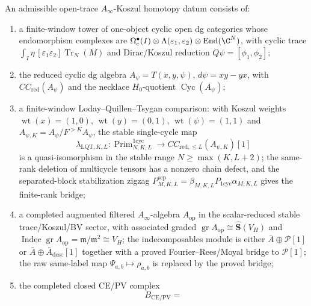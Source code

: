 \documentclass[11pt]{memoir}
\begin{document}
\begin{defn}\label{defn:stable-ainfty-koszul-homotopy-datum}
  An admissible open-trace \(A_\infty\)-Koszul homotopy datum
  consists of:
  \begin{enumerate}[label=(K\arabic*)]
    \item a finite-window tower of one-object cyclic open dg
      categories whose endomorphism complexes are
      \(\Omega_c^\bullet(I)\otimes\Lambda(\varepsilon_1,\varepsilon_2)
      \otimes\operatorname{End}(\C^N)\), with cyclic trace
      \(\int_I\eta\,[\varepsilon_1\varepsilon_2]\operatorname{Tr}_N(M)\)
      and Dirac/Koszul reduction \(Q\psi=[\phi_1,\phi_2]\);
    \item the reduced cyclic dg algebra \(A_\psi=T(x,y,\psi)\),
      \(d\psi=xy-yx\), with \(CC_{\mathrm{red}}(A_\psi)\) and the
      necklace \(H_0\)-quotient \(\operatorname{Cyc}(A_\psi)\);
    \item a finite-window Loday--Quillen--Tsygan comparison: with
      Koszul weights \(\operatorname{wt}(x)=(1,0)\),
      \(\operatorname{wt}(y)=(0,1)\),
      \(\operatorname{wt}(\psi)=(1,1)\) and
      \(A_{\psi,K}=A_\psi/F^{>K}A_\psi\), the stable single-cycle map
      \[
        \lambda_{\mathrm{LQT},K,L}\colon
        \operatorname{Prim}^{1\mathrm{cyc}}_{N,K,L}
        \longrightarrow
        CC_{\mathrm{red},\le L}(A_{\psi,K})[1]
      \]
	      is a quasi-isomorphism in the stable range
      \(N\geq\max(K,L+2)\); the same-rank deletion of multicycle
      tensors has a nonzero chain defect, and the separated-block stabilization
      zigzag \(P^{\mathrm{sep}}_{M,K,L}=
      \beta_{M,K,L}P_{1\mathrm{cyc}}\alpha_{M,K,L}\) gives the
      finite-rank bridge;
    \item a completed augmented filtered \(A_\infty\)-algebra
      \(A_{\mathrm{op}}\) in the scalar-reduced stable trace/Koszul/BV
      sector, with associated graded
      \(\operatorname{gr}A_{\mathrm{op}}\cong\widehat{\mathbf S}(V_H)\)
      and \(\operatorname{Indec}\operatorname{gr}A_{\mathrm{op}}
      =\mathfrak m/\mathfrak m^2\cong V_H\); the indecomposables module
      is either \(\bar A\oplus\mathcal P[1]\) or
      \(\bar A\oplus\bar A_{\mathrm{desc}}[1]\) together with a proved
      Fourier--Rees/Moyal bridge to \(\mathcal P[1]\); the raw
      same-label map \(\Psi_{a,b}\mapsto\rho_{a,b}\) is replaced by
      the proved bridge;
    \item the completed closed CE/PV complex
      \[
        B_{\mathrm{CE/PV}}
          =
\]
\end{enumerate}
\end{defn}
\end{document}
